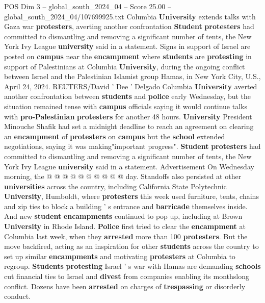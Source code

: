 \begin{textsample}{POS Dim 3 – global\_south\_2024\_04 – Score 25.00 – global\_south\_2024\_04/107699925.txt}  \label{ex:f3_pos_210}
Columbia \textbf{University} extends talks with Gaza war \textbf{protesters}, averting another confrontation \textbf{Student} \textbf{protesters} had committed to dismantling and removing a significant number of tents, the New York Ivy League \textbf{university} said in a statement.
Signs in support of Israel are posted on \textbf{campus} near the \textbf{encampment} where \textbf{students} are \textbf{protesting} in support of Palestinians at Columbia \textbf{University}, during the ongoing conflict between Israel and the Palestinian Islamist group Hamas, in New York City, U.S., April 24, 2024.
REUTERS/David ' Dee ' Delgado Columbia \textbf{University} averted another confrontation between \textbf{students} and \textbf{police} early Wednesday, but the situation remained tense with \textbf{campus} officials saying it would continue talks with \textbf{pro-Palestinian} \textbf{protesters} for another 48 hours. \textbf{University} President Minouche Shafik had set a midnight deadline to reach an agreement on clearing an \textbf{encampment} of \textbf{protesters} on \textbf{campus} but the \textbf{school} extended negotiations, saying it was making"important progress". \textbf{Student} \textbf{protesters} had committed to dismantling and removing a significant number of tents, the New York Ivy League \textbf{university} said in a statement.
Advertisement On Wednesday morning, the @ @ @ @ @ @ @ @ @ @ day.
Standoffs also persisted at other \textbf{universities} across the country, including California State Polytechnic \textbf{University}, Humboldt, where \textbf{protesters} this week used furniture, tents, chains and zip ties to block a building ' s entrance and \textbf{barricade} themselves inside.
And new \textbf{student} \textbf{encampments} continued to pop up, including at Brown \textbf{University} in Rhode Island. \textbf{Police} first tried to clear the \textbf{encampment} at Columbia last week, when they \textbf{arrested} more than 100 \textbf{protesters}.
But the move backfired, acting as an inspiration for other \textbf{students} across the country to set up similar \textbf{encampments} and motivating \textbf{protesters} at Columbia to regroup. \textbf{Students} \textbf{protesting} Israel ' s war with Hamas are demanding \textbf{schools} cut financial ties to Israel and \textbf{divest} from companies enabling its monthslong conflict.
Dozens have been \textbf{arrested} on charges of \textbf{trespassing} or disorderly conduct.

\end{textsample}
